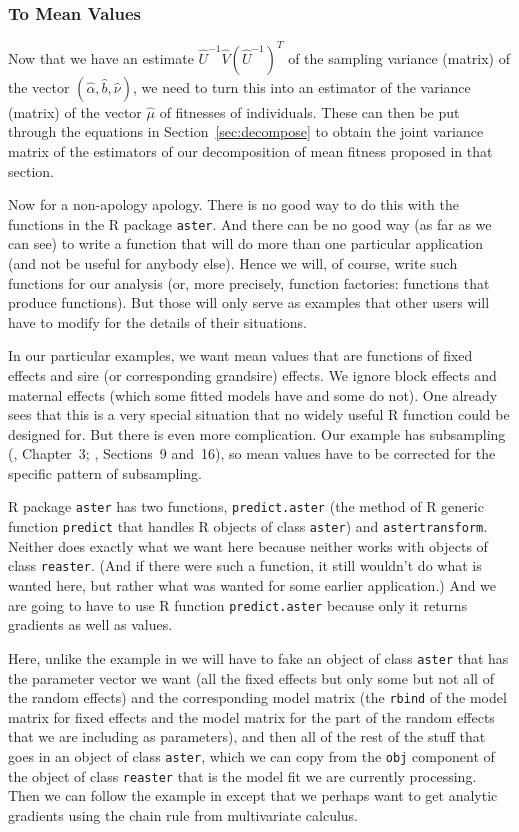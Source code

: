 \documentclass[11pt]{article}
\let\code=\texttt
\begin{document}
\subsubsection{To Mean Values}

Now that we have
an estimate $\widehat{U}^{-1} \widehat{V} (\widehat{U}^{-1})^T$
of the sampling variance (matrix) of
the vector $(\hat{\alpha}, \hat{b}, \hat{\nu})$, we need to turn this
into an estimator of the variance (matrix) of the vector $\hat{\mu}$ of
fitnesses of individuals.  These can then be put through the equations
in Section~\ref{sec:decompose} to obtain the joint variance matrix of
the estimators of our decomposition of mean fitness proposed in that section.

Now for a non-apology apology.  There is no good way to do this with the
functions in the R package \code{aster}.  And there can be no good way
(as far as we can see) to write a function that will do more than one
particular application (and not be useful for anybody else).  Hence
we will, of course, write such functions for our analysis (or, more
precisely, function factories: functions that produce functions).
But those will only serve as examples that other users will have to
modify for the details of their situations.

In our particular examples, we want mean values that are functions of
fixed effects and sire (or corresponding grandsire) effects.  We ignore
block effects and maternal effects (which some fitted models have and
some do not).  One already sees that this is a very special situation
that no widely useful R function could be designed for.  But there is
even more complication.  Our example has subsampling
(\citealp{aster-theory}, Chapter~3; \citealp{zenodo}, Sections~9 and~16),
so mean values have to be corrected for the specific pattern of subsampling.

R package \code{aster} has two functions, \code{predict.aster} (the method
of R generic function \code{predict} that handles R objects of class
\code{aster}) and \code{astertransform}.  Neither does exactly what we
want here because neither works with objects of class \code{reaster}.
(And if there were such a function, it still wouldn't do what is wanted
here, but rather what was wanted for some earlier application.)
And we are going to have to use R function \code{predict.aster} because
only it returns gradients as well as values.

Here, unlike the example in \citet[Section~9]{zenodo} we will have to
fake an object of class \code{aster} that has the parameter vector we
want (all the fixed effects but only some but not all of the random effects)
and the corresponding model matrix (the \code{rbind} of the model matrix
for fixed effects and the model matrix for the part of the random effects
that we are including as parameters), and then all of the rest of the
stuff that goes in an object of class \code{aster}, which we can copy
from the \code{obj} component of the object of class \code{reaster} that
is the model fit we are currently processing.  Then we can follow the
example in \citet[Section~9]{zenodo} except that we perhaps want to
get analytic gradients using the chain rule from multivariate calculus.
\end{document}
